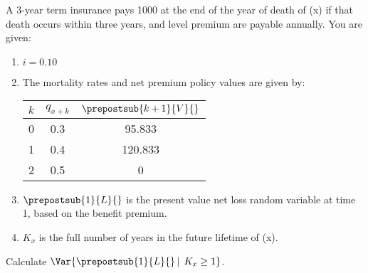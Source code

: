 A 3-year term insurance pays 1000 at the end of the year of death of (x) if
that death occurs within three years, and level premium are payable annually.
You are given:
\begin{enumerate}
\item $i= 0.10$
\item The mortality rates and net premium policy values are given by: 
\begin{center}\begin{tabular}{|c|c|c|} \hline
   $k$ & $q_{x+k}$ & $\prepostsub{k+1}{V}{}$ \\ \hline
    0 & 0.3 &	95.833  \\ \hline
    1 &	0.4 &	120.833 \\ \hline
    2 &	0.5 &  0 \\ \hline
\end{tabular}\end{center}
\item $\prepostsub{1}{L}{}$ is the present value net loss random variable at time 1, based on the benefit premium. 
\item $K_x$ is the full number of years in the future lifetime of (x).
\end{enumerate}
Calculate $\Var{\prepostsub{1}{L}{}\left|\right.\,K_x\geq 1}$.
